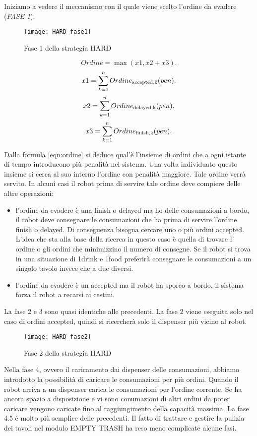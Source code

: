 Iniziamo a vedere il meccanismo con il quale viene scelto l'ordine da evadere (\emph{FASE 1}).

\begin{figure}[htp]
  \texttt{[image: HARD\_fase1]}
  \caption{Fase 1 della strategia HARD}
  \label{fig:figure7}
\end{figure}

\begin{equation}
\label{eqn:ordine}
Ordine=\max(x1,x2+x3).
\end{equation}
\[
x1=\sum_{k=1}^n Ordine_\textup{accepted,k}(pen).
\]\[
x2=\sum_{k=1}^n Ordine_\textup{delayed,k}(pen).
\]\[
x3=\sum_{k=1}^n Ordine_\textup{finish,k}(pen).
\]

Dalla formula \eqref{eqn:ordine} si deduce qual'è l'insieme di ordini che a ogni istante di tempo introducono più penalità nel sistema. Una volta individuato questo insieme si cerca al suo interno l'ordine con penalità maggiore. Tale ordine verrà servito.
In alcuni casi il robot prima di servire tale ordine deve compiere delle altre operazioni:
\begin{itemize}
  \item l'ordine da evadere è una finish o delayed ma ho delle consumazioni a bordo, il robot deve consegnare le consumazioni che ha prima di servire l'ordine finish o delayed. Di conseguenza bisogna cercare uno o più ordini accepted. L'idea che sta alla base della ricerca in questo caso è quella di trovare l' ordine o gli ordini che minimizzino il numero di consegne. Se il robot si trova in una situazione di 1drink e 1food preferirà consegnare le consumazioni a un singolo tavolo invece che a due diversi.
  \item l'ordine da evadere è un accepted ma il robot ha sporco a bordo, il sistema forza il robot a recarsi ai cestini.
\end{itemize}

La fase 2 e 3 sono quasi identiche alle precedenti. La fase 2 viene eseguita solo nel caso di ordini accepted, quindi si ricercherà solo il dispenser più vicino al robot.

\begin{figure}[htp]
  \texttt{[image: HARD\_fase2]}
  \caption{Fase 2 della strategia HARD}
  \label{fig:figure8}
\end{figure}

Nella fase 4, ovvero il caricamento dai dispenser delle consumazioni, abbiamo introdotto la possibilità di caricare le consumazioni per più ordini. Quando il robot arriva a un dispenser carica le consumazioni per l'ordine corrente. Se ha ancora spazio a disposizione e vi sono conumazioni di altri ordini da poter caricare vengono caricate fino al raggiungimento della capacità massima.
La fase 4.5 è molto più semplice delle precedenti. Il fatto di trattare e gestire la pulizia dei tavoli nel modulo EMPTY TRASH ha reso meno complicate alcune fasi.

